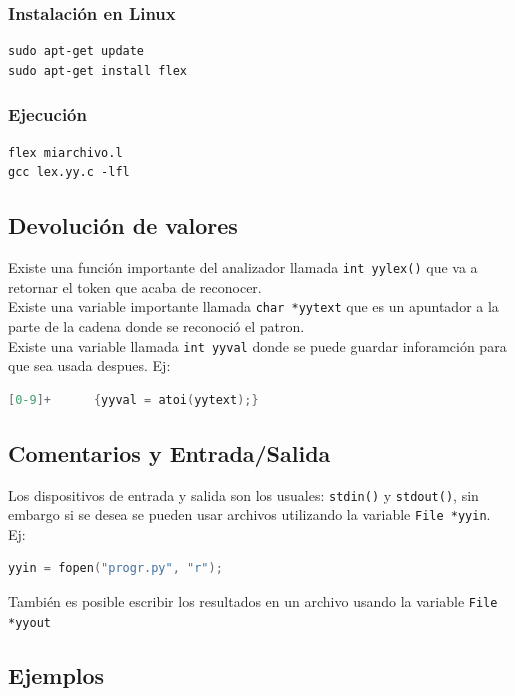 \subsubsection{Instalación en Linux}
\begin{lstlisting}[language=shell]
sudo apt-get update
sudo apt-get install flex
\end{lstlisting}

\subsubsection{Ejecución}
\begin{lstlisting}[language=shell]
flex miarchivo.l
gcc lex.yy.c -lfl
\end{lstlisting}

\subsection{Devolución de valores}

Existe una función importante del analizador llamada \verb|int yylex()| que va a retornar el token que acaba de reconocer. \\
Existe una variable importante llamada \verb|char *yytext| que es un apuntador a la parte de la cadena donde se reconoció el patron.\\
Existe una variable llamada \verb|int yyval| donde se puede guardar inforamción para que sea usada despues. Ej:\\
\begin{lstlisting}[language=C]
[0-9]+      {yyval = atoi(yytext);}
\end{lstlisting}

\subsection{Comentarios y Entrada/Salida}

Los dispositivos de entrada y salida son los usuales: \verb|stdin()| y \verb|stdout()|, sin embargo si se  desea se pueden usar archivos utilizando la variable \verb|File *yyin|. Ej:\\
\begin{lstlisting}[language=C]
yyin = fopen("progr.py", "r");
\end{lstlisting}

También es posible escribir los resultados en un archivo usando la variable \verb|File *yyout|

\subsection{Ejemplos}
